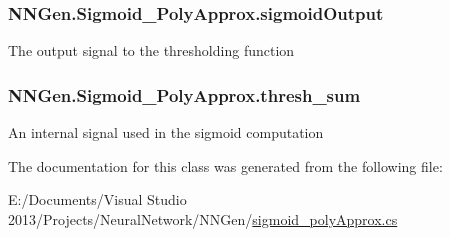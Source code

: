 \subsubsection[{sigmoid\+Output}]{ N\+N\+Gen.\+Sigmoid\+\_\+\+Poly\+Approx.\+sigmoid\+Output\hspace{0.3cm}{\ttfamily [get]}}\label{class_n_n_gen_1_1_sigmoid___poly_approx_a93bf10c040a0ed7dd4428c9df4539188}


The output signal to the thresholding function 

\hypertarget{class_n_n_gen_1_1_sigmoid___poly_approx_af795af0bd003e50d11e5f3c904d03dca}{}
\subsubsection[{thresh\+\_\+sum}]{ N\+N\+Gen.\+Sigmoid\+\_\+\+Poly\+Approx.\+thresh\+\_\+sum\hspace{0.3cm}{\ttfamily [get]}}\label{class_n_n_gen_1_1_sigmoid___poly_approx_af795af0bd003e50d11e5f3c904d03dca}


An internal signal used in the sigmoid computation 



The documentation for this class was generated from the following file\+:\begin{DoxyCompactItemize}
\item 
E\+:/\+Documents/\+Visual Studio 2013/\+Projects/\+Neural\+Network/\+N\+N\+Gen/\hyperlink{sigmoid__poly_approx_8cs}{sigmoid\+\_\+poly\+Approx.\+cs}\end{DoxyCompactItemize}
